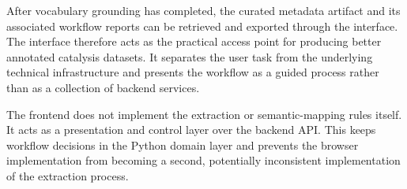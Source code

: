 After vocabulary grounding has completed, the curated metadata artifact and its associated workflow reports can be retrieved and exported through the interface.
The interface therefore acts as the practical access point for producing better annotated catalysis datasets.
It separates the user task from the underlying technical infrastructure and presents the workflow as a guided process rather than as a collection of backend services.

The frontend does not implement the extraction or semantic-mapping rules itself.
It acts as a presentation and control layer over the backend \ac{API}.
This keeps workflow decisions in the Python domain layer and prevents the browser implementation from becoming a second, potentially inconsistent implementation of the extraction process.
